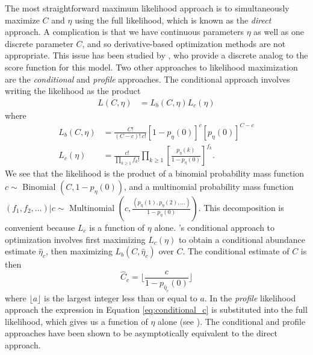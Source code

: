 \documentclass[12pt]{article}
\newcommand{\kmax}{k_{\text{max}}}
\theoremstyle{break}
\theoremstyle{break}
\begin{document}
The most straightforward maximum likelihood approach is to simultaneously maximize $C$ and $\eta$ using the full likelihood, which is known as the \textit{direct} approach.  A complication is that we have continuous parameters $\eta$ as well as one discrete parameter $C$, and so derivative-based optimization methods are not appropriate.  This issue has been studied by \citet{lindsay_1987}, who provide a discrete analog to the score function for this model.  %
Two other approaches to likelihood maximization are the \textit{conditional} and \textit{profile} approaches.  The conditional approach \citep{sanathanan_1977} involves writing the likelihood as the product
\begin{align}
 L(C, \eta) &= L_b(C, \eta)L_c(\eta) \label{eq:likelihood}
\end{align}
where
 \begin{align}
 L_b(C, \eta) &= \frac{C!}{(C-c)! \ c!} \left[1 - p_{\eta}(0) \right]^c \left[ p_{\eta}(0) \right]^{C-c}  %
  \label{eq:binomial_likelihood}\\
 L_c(\eta) &= \frac{c!}{\displaystyle  \prod_{k \geq 1} f_k!} \prod_{k \geq 1} \left[ \frac{p_{\eta}(k)}{1-p_{\eta}(0)} \right]^{f_k}. \label{eq:conditional_likelihood} %
\end{align}
We see that the likelihood is the product of a binomial probability mass function $c \sim$ Binomial $\left(C, 1- p_{\eta}(0)\right)$, and a multinomial probability mass function $(f_1, f_2, \ldots)|c \sim$  Multinomial $\left(c,  \frac{(p_{\eta}(1), p_{\eta}(2), \ldots)}{1-p_{\eta}(0)}\right)$.
This decomposition is convenient because $L_c$ is a function of $\eta$ alone.
\citet{sanathanan_1977}'s conditional approach to optimization involves first maximizing  $L_c(\eta)$ to obtain a conditional abundance estimate $\widehat{\eta}_c$, then maximizing $L_b(C, \widehat{\eta}_c)$ over $C$.
The conditional estimate of $C$ is then
\begin{equation}
\widehat{C}_c = \Biggl\lfloor \frac{c}{1-p_{\widehat{\eta}_c}(0)} \Biggr\rfloor \label{eq:conditional_c}
\end{equation}
where $\lfloor a \rfloor$ is the largest integer less than or equal to $a$.  In the \textit{profile} likelihood approach the expression in Equation \eqref{eq:conditional_c} is substituted into the full likelihood, which gives us a function of $\eta$ alone (see \citet{wang_2005}).  The conditional and profile approaches have been shown to be asymptotically equivalent to the direct approach.
\end{document}
